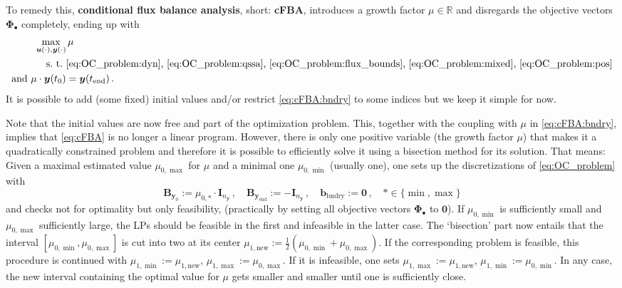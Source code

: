 \documentclass{article}
\newcommand{\defeq}{\mathrel{:=}}%
\newcommand{\setR}{\mathbb{R}}%
\newcommand{\vectorfont}[1]{\boldsymbol{#1}}%
\newcommand{\greekvectorfont}[1]{\boldsymbol{#1}}%
\newcommand{\matrixfont}[1]{\mathbf{#1}}%
\newcommand{\bvec}{\vectorfont{b}}%
\newcommand{\uvec}{\vectorfont{u}}%
\newcommand{\yvec}{\vectorfont{y}}%
\newcommand{\Phivec}{\greekvectorfont{\Phi}}
\newcommand{\nullvec}{\greekvectorfont{0}}
\newcommand{\Bmat}{\matrixfont{B}}
\newcommand{\Imat}{\matrixfont{I}}%
\begin{document}
To remedy this, \textbf{conditional flux balance analysis}, short: \textbf{cFBA}, introduces a growth factor $\mu \in \setR$ and disregards the objective vectors $\Phivec_{\bullet}$ completely, ending up with
\begin{subequations}
\begin{align}
	\max_{\uvec(\cdot), \yvec(\cdot)}  &\,\mu
	\label{eq:cFBA:obj}
\\
	\text{s.\ t.\ }&\text{\eqref{eq:OC_problem:dyn}, \eqref{eq:OC_problem:qssa}, \eqref{eq:OC_problem:flux_bounds}, \eqref{eq:OC_problem:mixed}, \eqref{eq:OC_problem:pos}}\notag
\\
\text{and } \mu \cdot \yvec(t_0) &= \yvec(t_{\mathrm{end}})\,.
\label{eq:cFBA:bndry}
\end{align}%
\label{eq:cFBA}%
\end{subequations}
{\color{gray} 
It is possible to add (some fixed) initial values and\slash or restrict \eqref{eq:cFBA:bndry} to some indices but we keep it simple for now.
}
%

%
Note that the initial values are now free and part of the optimization problem.
This, together with the coupling with $\mu$ in \eqref{eq:cFBA:bndry}, implies that \eqref{eq:cFBA} is no longer a linear program.
However, there is only one positive variable (the growth factor $\mu$) that makes it a quadratically constrained problem and therefore it is possible to efficiently solve it using a bisection method for its solution.
That means: Given a maximal estimated value $\mu_{0,\max}$ for $\mu$ and a minimal one $\mu_{0,\min}$ (usually one), one sets up the discretizations of \eqref{eq:OC_problem} with
\[
\Bmat_{\yvec_0} \defeq \mu_{0,\ast} \cdot \Imat_{n_{\yvec}}\,,\quad
\Bmat_{\yvec_{\mathrm{end}}} \defeq -\Imat_{n_{\yvec}}\,,\quad
\bvec_{\mathrm{bndry}} \defeq \nullvec\,,\quad
\ast \in \lbrace \min, \max \rbrace
\]
and checks not for optimality but only feasibility, (practically by setting all objective vectors $\Phivec_{\bullet}$ to $\nullvec$). 
If $\mu_{0,\min}$ is sufficiently small and $\mu_{0,\max}$ sufficiently large, the LPs should be feasible in the first and infeasible in the latter case.
The \lq bisection\rq{} part now entails that the interval $[\mu_{0,\min}, \mu_{0,\max}]$ is cut into two at its center $\mu_{1,\mathrm{new}} \defeq \tfrac{1}{2}(\mu_{0,\min}+ \mu_{0,\max})$.
If the corresponding problem is feasible, this procedure is continued with $\mu_{1,\min} \defeq \mu_{1,\mathrm{new}}$, $\mu_{1,\max}\defeq \mu_{0,\max}$.
If it is infeasible, one sets $\mu_{1,\max}\defeq \mu_{1,\mathrm{new}}$, $\mu_{1,\min}\defeq \mu_{0,\min}$.
In any case, the new interval containing the optimal value for $\mu$ gets smaller and smaller until one is sufficiently close.
\end{document}
